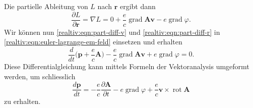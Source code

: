 Die partielle Ableitung von \(L\) nach \(\mathbf{r}\) ergibt dann
\begin{equation}
    \frac{\partial L}{\partial \mathbf{r}} = \nabla L
    = 0 + \frac{e}{c} \operatorname{grad} \mathbf{Av} - e \operatorname{grad} \varphi.
    \label{realtiv:eqn:part-diff-r}
\end{equation}
Wir können nun \eqref{realtiv:eqn:part-diff-v} und \eqref{realtiv:eqn:part-diff-r}
in \eqref{realtiv:eqn:euler-lagrange-em-feld} einsetzen und erhalten
\begin{equation}
    \frac{d}{dt} \biggl(\mathbf{p} + \frac{e}{c} \mathbf{A}\biggr)
    - \frac{e}{c} \operatorname{grad} \mathbf{Av} + e \operatorname{grad} \varphi = 0.
    \label{realtiv:eqn:euler-lagrange-em-eingesetzt}
\end{equation}
Diese Differentialgleichung kann mittels Formeln der Vektoranalysis
umgeformt werden, um schliesslich
\begin{equation}
    \frac{d\mathbf{p}}{dt} = -\frac{e}{c} \frac{\partial\mathbf{A}}{\partial t}
    - e \operatorname{grad} \varphi +
    \frac{e}{c} \mathbf{v} \times \operatorname{rot} \mathbf{A}
    \label{realtiv:eqn:euler-lagrange-em-eingesetzt}
\end{equation}
zu erhalten.

